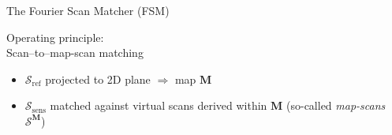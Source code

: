 \begin{frame}[noframenumbering]{The Fourier Scan Matcher (FSM)}


  \begin{center}
    Operating principle: \\
    Scan--to--map-scan matching \\
  \end{center}

  \begin{itemize}
    \item \textcolor{r}{$\mathcal{S}_{\text{ref}}$} projected to 2D plane $\Rightarrow$ map $\bm{M}$
    \item \textcolor{b}{$\mathcal{S}_{\text{sens}}$} matched against virtual scans derived within $\bm{M}$ (so-called \textit{map-scans} $\mathcal{S}^{\bm{M}}$)
  \end{itemize}

\end{frame}
